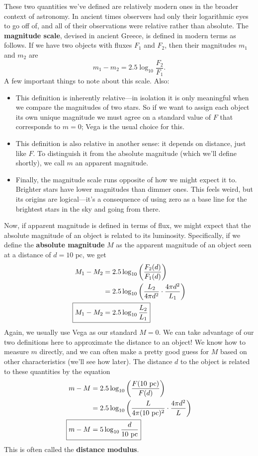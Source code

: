 \documentclass[../a062main.tex]{subfiles}
\begin{document}
These two quantities we've defined are relatively modern ones in the broader context of astronomy.
In ancient times observers had only their logarithmic eyes to go off of, and all of their observations were relative rather than absolute.
The \textbf{magnitude scale}, devised in ancient Greece, is defined in modern terms as follows.
If we have two objects with fluxes $F_1$ and $F_2$, then their magnitudes $m_1$ and $m_2$ are
\[ \boxed{m_1 - m_2 = 2.5 \log_{10} \frac{F_2}{F_1}}. \]
A few important things to note about this scale.
Also:
\begin{itemize}[topsep=0pt]
    \item This definition is inherently relative---in isolation it is only meaningful when we compare the magnitudes of two stars.
    So if we want to assign each object its own unique magnitude we must agree on a standard value of $F$ that corresponds to $m=0$; Vega is the usual choice for this.

    \item This definition is also relative in another sense: it depends on distance, just like $F$.
    To distinguish it from the absolute magnitude (which we'll define shortly), we call $m$ an apparent magnitude.

    \item Finally, the magnitude scale runs opposite of how we might expect it to.
    Brighter stars have lower magnitudes than dimmer ones.
    This feels weird, but its origins are logical---it's a consequence of using zero as a base line for the brightest stars in the sky and going from there.
\end{itemize}
Now, if apparent magnitude is defined in terms of flux, we might expect that the absolute magnitude of an object is related to its luminosity.
Specifically, if we define the \textbf{absolute magnitude} $M$ as the apparent magnitude of an object seen at a distance of $d = 10 \text{ pc}$, we get
\begin{align*}
    M_1 - M_2 &= 2.5 \log_{10} \left( \frac{F_2 (d)}{F_1 (d)} \right) \\
    &= 2.5 \log_{10} \left( \frac{L_2}{4 \pi d^2} \cdot \frac{4\pi d^2}{L_1} \right) \\
    \Aboxed{M_1 - M_2 &= 2.5 \log_{10} \frac{L_2}{L_1}}
\end{align*}
Again, we usually use Vega as our standard $M=0$.
We can take advantage of our two definitions here to approximate the distance to an object!
We know how to measure $m$ directly, and we can often make a pretty good guess for $M$ based on other characteristics (we'll see how later).
The distance $d$ to the object is related to these quantities by the equation
\begin{align*}
    m - M &= 2.5 \log_{10} \left( \frac{F (10 \textrm{ pc})}{F (d)} \right) \\
    &= 2.5 \log_{10} \left( \frac{L}{4 \pi (10 \textrm{ pc})^2} \cdot \frac{4\pi d^2}{L} \right) \\
    \Aboxed{m - M &= 5 \log_{10} \frac{d}{10 \textrm{ pc}}}
\end{align*}
This is often called the \textbf{distance modulus}.
\end{document}
